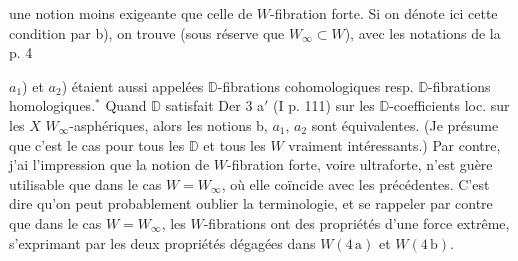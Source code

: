 
une notion moins exigeante que celle de $W$-fibration forte. Si on dénote ici cette condition par b), on trouve (sous réserve que $W_\infty\subset W$), avec les notations de la p. 4

 

 $a_1$) et $a_2$) étaient aussi appelées $\mathbb D$-fibrations cohomologiques resp. $\mathbb D$-fibrations homologiques.$^{*}$
 Quand $\mathbb D$ satisfait Der 3 a$'$ (I p. 111) sur les $\mathbb D$-coefficients loc.  sur les $X$ $W_\infty$-asphériques, alors les notions b, $a_1$, $a_2$ sont équivalentes. (Je présume que c'est le cas pour tous les $\mathbb D$ et tous les $W$ vraiment intéressants.) Par contre, j'ai l'impression que la notion de $W$-fibration forte, voire ultraforte, n'est guère utilisable que dans le cas $W=W_\infty$, où elle coïncide avec les précédentes. C'est dire qu'on peut probablement oublier la terminologie, et se rappeler par contre que dans le cas $W=W_\infty$, les $W$-fibrations ont des propriétés d'une force extrême, s'exprimant par les deux propriétés dégagées dans $W(4\,\mathrm a)$ et $W(4\,\mathrm b)$.


